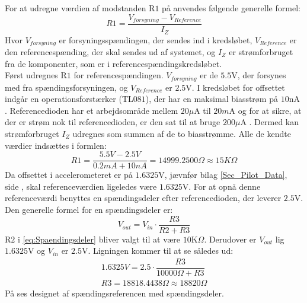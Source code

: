 \noindent For at udregne værdien af modstanden R$1$ på  anvendes følgende generelle formel:
\begin{equation}\label{eq:udregning_modstand}
R1 = \dfrac{V_{forsyning} - V_{Reference}}{I_{Z}}
\end{equation}
\noindent Hvor $V_{forsyning}$ er forsyningsspændingen, der sendes ind i kredsløbet, $V_{Reference}$ er den referencespænding, der skal sendes ud af systemet, og $I_{Z}$ er strømforbruget fra de komponenter, som er i referencespændingskredsløbet. \\
Først udregnes R$1$ for referencespændingen. $V_{forsyning}$ er de $5.5$V, der forsynes med fra spændingsforsyningen, og $V_{Reference}$ er $2.5$V. I kredsløbet for offsettet indgår en operationsforstærker (TL$081$), der har en maksimal biasstrøm på $10$nA \cite{Corporation1995}. Referencedioden har et arbejdsområde mellem $20\mu$A til $20m$A og for at sikre, at der er strøm nok til referencedioden, er den sat til at bruge $200\mu$A \cite{National2005}. Dermed kan strømforbruget $I_{Z}$ udregnes som summen af de to biasstrømme. Alle de kendte værdier indsættes i formlen:
\begin{equation}
R1 = \frac{5.5V - 2.5V}{0.2mA + 10nA} = 14999.2500\Omega \approx 15K\Omega
\end{equation}  
Da offsettet i accelerometeret er på $1.6325$V, jævnfør bilag \ref{Sec_Pilot_Data}, side \pageref{Sec_Pilot_Data}, skal referenceværdien ligeledes være $1.6325$V. For at opnå denne referenceværdi benyttes en spændingsdeler efter referencedioden, der leverer $2.5$V. Den generelle formel for en spændingsdeler er: 
\begin{equation} \label{eq:Spaendingsdeler}
V_{out} = V_{in} \cdot \dfrac{R3}{R2 + R3}
\end{equation}
\noindent R$2$ i \eqref{eq:Spaendingsdeler} bliver valgt til at være $10$K$\Omega$. Derudover er $V_{out}$ lig $1.6325$V og $V_{in}$ er $2.5$V. Ligningen kommer til at se således ud: 
\begin{eqnarray}
1.6325V = 2.5 \cdot \dfrac{R3}{10000\Omega + R3} \\
R3 = 18818.4438\Omega \approx 18820\Omega
\end{eqnarray}
\noindent På  ses designet af spændingsreferencen med spændingsdeler. 
